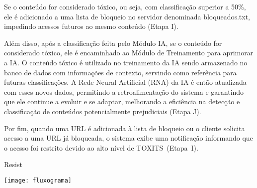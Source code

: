Se o conteúdo for considerado tóxico, ou seja, com classificação superior a 50\%, ele é adicionado a uma lista de bloqueio no servidor denominada bloqueados.txt, impedindo acessos futuros ao mesmo conteúdo (Etapa I).

Além disso, após a classificação feita pelo Módulo IA, se o conteúdo for considerado tóxico, ele é encaminhado ao Módulo de Treinamento para aprimorar a IA. O conteúdo tóxico é utilizado no treinamento da IA sendo armazenado no banco de dados com informações de contexto, servindo como referência para futuras classificações. A Rede Neural Artificial (RNA) da IA é então atualizada com esses novos dados, permitindo a retroalimentação do sistema e garantindo que ele continue a evoluir e se adaptar, melhorando a eficiência na detecção e classificação de conteúdos potencialmente prejudiciais (Etapa J).

Por fim, quando uma URL é adicionada à lista de bloqueio ou o cliente solicita acesso a uma URL já bloqueada, o sistema exibe uma notificação informando que o acesso foi restrito devido ao alto nível de TOXITS (Etapa I).

\begin{flowchart}[H]
    \centering
    \caption{Resist}%
    \label{fcht:fluxograma}
    \texttt{[image: fluxograma]}
    \end{flowchart}